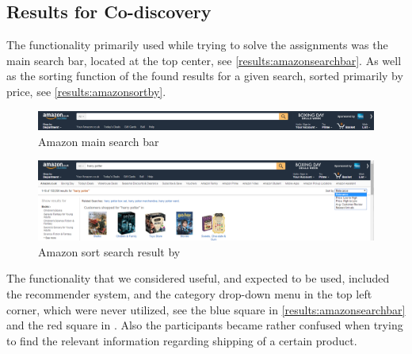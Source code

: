 \subsection{Results for Co-discovery}
The functionality primarily used while trying to solve the assignments was the main search bar, located at the top center, see \autoref{results:amazonsearchbar}. As well as the sorting function of the found results for a given search, sorted primarily by price, see \autoref{results:amazonsortby}.

\begin{figure}[h]
\includegraphics[scale=0.3]{./includes/amazon_search_bar.png}
\caption{Amazon main search bar}
\label{results:amazonsearchbar}
\end{figure}

\begin{figure}[h]
\includegraphics[scale=0.3]{./includes/amazon_sort_by.png}
\caption{Amazon sort search result by}
\label{results:amazonsortby}
\end{figure}

The functionality that we considered useful, and expected to be used, included the recommender system, and the category drop-down menu in the top left corner, which were never utilized, see the blue square in \autoref{results:amazonsearchbar} and the red square in . Also the participants became rather confused when trying to find the relevant information regarding shipping of a certain product.

